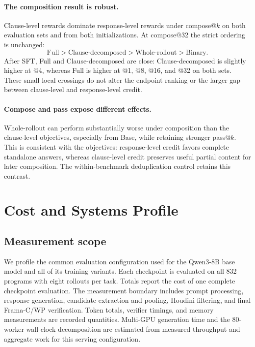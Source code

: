 \documentclass[10pt]{article}
\begin{document}
\paragraph{The composition result is robust.}
Clause-level rewards dominate response-level rewards under compose@\(k\) on
both evaluation sets and from both initializations.  At compose@32 the strict
ordering is unchanged:
\[
\text{Full} > \text{Clause-decomposed} > \text{Whole-rollout} > \text{Binary}.
\]
After SFT, Full and Clause-decomposed are close: Clause-decomposed is slightly
higher at @4, whereas Full is higher at @1, @8, @16, and @32 on both sets.
These small local crossings do not alter the endpoint ranking or the larger
gap between clause-level and response-level credit.

\paragraph{Compose and pass expose different effects.}
Whole-rollout can perform substantially worse under composition than the
clause-level objectives, especially from Base, while retaining stronger pass@\(k\).
This is consistent with the objectives: response-level credit favors complete
standalone answers, whereas clause-level credit preserves useful partial
content for later composition.  The within-benchmark deduplication control
retains this contrast.

\section{Cost and Systems Profile}
\label{app:supp-resources}

\subsection{Measurement scope}

We profile the common evaluation configuration used for the Qwen3-8B base
model and all of its training variants.  Each checkpoint is evaluated on all
832 programs with eight rollouts per task. Totals report the cost of one
complete checkpoint evaluation. The measurement boundary includes prompt processing, response
generation, candidate extraction and pooling, Houdini filtering, and final
Frama-C/WP verification.  Token totals, verifier timings, and memory
measurements are recorded quantities. Multi-GPU generation time and the
80-worker wall-clock decomposition are estimated from measured throughput
and aggregate work for this serving configuration.
\end{document}
